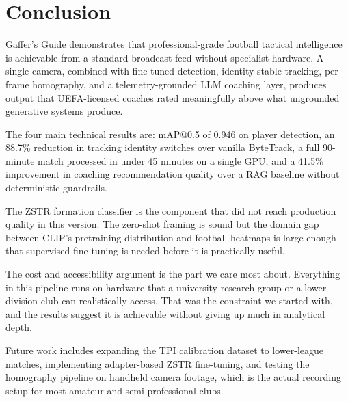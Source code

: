\documentclass[conference]{IEEEtran}
\begin{document}
\section{Conclusion}
\label{sec:conclusion}

Gaffer's Guide demonstrates that professional-grade football tactical intelligence is achievable from a standard broadcast feed without specialist hardware. A single camera, combined with fine-tuned detection, identity-stable tracking, per-frame homography, and a telemetry-grounded LLM coaching layer, produces output that UEFA-licensed coaches rated meaningfully above what ungrounded generative systems produce.

The four main technical results are: mAP@0.5 of 0.946 on player detection, an 88.7\% reduction in tracking identity switches over vanilla ByteTrack, a full 90-minute match processed in under 45 minutes on a single GPU, and a 41.5\% improvement in coaching recommendation quality over a RAG baseline without deterministic guardrails.

The ZSTR formation classifier is the component that did not reach production quality in this version. The zero-shot framing is sound but the domain gap between CLIP's pretraining distribution and football heatmaps is large enough that supervised fine-tuning is needed before it is practically useful.

The cost and accessibility argument is the part we care most about. Everything in this pipeline runs on hardware that a university research group or a lower-division club can realistically access. That was the constraint we started with, and the results suggest it is achievable without giving up much in analytical depth.

Future work includes expanding the TPI calibration dataset to lower-league matches, implementing adapter-based ZSTR fine-tuning, and testing the homography pipeline on handheld camera footage, which is the actual recording setup for most amateur and semi-professional clubs.



\end{document}
